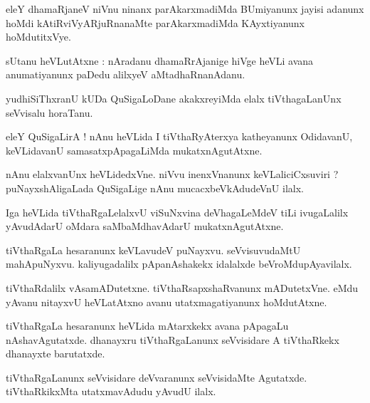 \documentclass{article}
\begin{document}
\begin{mn}
eleY dhamaRjaneV niVnu ninanx parAkarxmadiMda BUmiyanunx  jayisi adanunx hoMdi kAtiRviVyARjuRnanaMte
parAkarxmadiMda KAyxtiyanunx hoMdutitxVye.
\end{mn}

\begin{mn}
sUtanu heVLutAtxne : nAradanu dhamaRrAjanige hiVge heVLi avana anumatiyanunx paDedu alilxyeV 
aMtadhaRnanAdanu.
\end{mn}

\begin{mn}
yudhiSiThxranU kUDa QuSigaLoDane akakxreyiMda elalx tiVthagaLanUnx seVvisalu horaTanu.
\end{mn}

\begin{mn}
eleY QuSigaLirA ! nAnu heVLida I tiVthaRyAterxya katheyanunx OdidavanU, keVLidavanU 
samasatxpApagaLiMda mukatxnAgutAtxne.
\end{mn}

\begin{mn}
nAnu elalxvanUnx heVLidedxVne. niVvu inenxVnanunx keVLaliciCxsuviri ? puNayxshAligaLada 
QuSigaLige nAnu mucacxbeVkAdudeVnU ilalx.
\end{mn}


\begin{mn}
Iga heVLida tiVthaRgaLelalxvU viSuNxvina deVhagaLeMdeV tiLi ivugaLalilx yAvudAdarU oMdara 
saMbaMdhavAdarU mukatxnAgutAtxne.
\end{mn}

\begin{mn}
tiVthaRgaLa hesaranunx keVLavudeV puNayxvu. seVvisuvudaMtU mahApuNyxvu. kaliyugadalilx 
pApanAshakekx idalalxde beVroMdupAyavilalx.
\end{mn}

\begin{mn}
tiVthaRdalilx vAsamADutetxne. tiVthaRsapxshaRvanunx mADutetxVne. eMdu yAvanu nitayxvU heVLatAtxno 
avanu utatxmagatiyanunx hoMdutAtxne.
\end{mn}

\begin{mn}
tiVthaRgaLa hesaranunx heVLida mAtarxkekx avana pApagaLu nAshavAgutatxde. dhanayxru tiVthaRgaLanunx
seVvisidare A tiVthaRkekx dhanayxte barutatxde.
\end{mn}

\begin{mn}
tiVthaRgaLanunx seVvisidare deVvaranunx seVvisidaMte Agutatxde. tiVthaRkikxMta utatxmavAdudu 
yAvudU ilalx. 
\end{mn}
\end{document}
